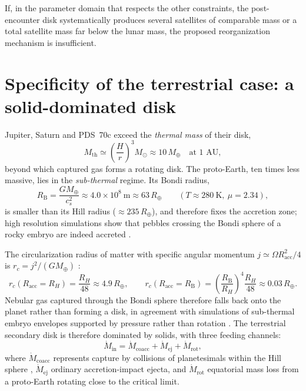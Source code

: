 \documentclass[11pt,a4paper,openany]{report}
\newcommand{\Mt}{M_{\oplus}}
\newcommand{\Rt}{R_{\oplus}}
\begin{document}
\begin{falsif}
If, in the parameter domain that respects the other constraints, the post-encounter disk
systematically produces several satellites of comparable mass or a total satellite mass far below
the lunar mass, the proposed reorganization mechanism is insufficient.
\end{falsif}

\section{Specificity of the terrestrial case: a solid-dominated disk}
\label{sec:soustherm}

Jupiter, Saturn and PDS~70c exceed the \emph{thermal mass} of their disk,
\begin{equation}
M_{\mathrm{th}}\simeq\left(\frac{H}{r}\right)^{3}M_\odot\approx10\,\Mt
\quad\text{at 1 AU},
\label{eq:Mth}
\end{equation}
beyond which captured gas forms a rotating disk. The proto-Earth, ten times less massive, lies in
the \emph{sub-thermal} regime. Its Bondi radius,
\begin{equation}
R_{\mathrm{B}}=\frac{G\Mt}{c_s^2}\approx4.0\times10^{8}\ \mathrm{m}\approx63\,\Rt
\qquad(T\approx280\ \mathrm{K},\ \mu=2.34),
\label{eq:Bondi}
\end{equation}
is smaller than its Hill radius ($\approx235\,\Rt$), and therefore fixes the accretion zone; high
resolution simulations show that pebbles crossing the Bondi sphere of a rocky embryo are indeed
accreted \cite{Popovas2018}.

The circularization radius of matter with specific angular momentum
$j\simeq\Omega R_{\mathrm{acc}}^2/4$ is $r_c=j^2/(G\Mt)$ \cite{QuillenTrilling1998}:
\begin{equation}
r_c(R_{\mathrm{acc}}=R_H)=\frac{R_H}{48}\approx4.9\,\Rt,
\qquad
r_c(R_{\mathrm{acc}}=R_{\mathrm{B}})=\left(\frac{R_{\mathrm{B}}}{R_H}\right)^{4}
\frac{R_H}{48}\approx0.03\,\Rt.
\label{eq:rc}
\end{equation}
Nebular gas captured through the Bondi sphere therefore falls back onto the planet rather than
forming a disk, in agreement with simulations of sub-thermal embryo envelopes supported by
pressure rather than rotation \cite{Ormel2015,Fung2015}. The terrestrial secondary disk is
therefore dominated by solids, with three feeding channels:
\begin{equation}
\dot M_{\mathrm{in}}=\dot M_{\mathrm{coacc}}+\dot M_{\mathrm{ej}}+\dot M_{\mathrm{rot}},
\label{eq:canaux}
\end{equation}
where $\dot M_{\mathrm{coacc}}$ represents capture by collisions of planetesimals within the Hill
sphere \cite{Ruskol1960,Weidenschilling1986}, $\dot M_{\mathrm{ej}}$ ordinary accretion-impact
ejecta, and $\dot M_{\mathrm{rot}}$ equatorial mass loss from a proto-Earth rotating close to the
critical limit.
\end{document}

